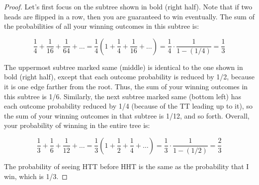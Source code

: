 \documentclass[14pt]{extarticle}
\begin{document}
\begin{proof}
Let’s first focus on the subtree shown in bold (right half). Note that if two heads are flipped in a row, then you are guaranteed to win eventually. The sum of the probabilities of all your winning outcomes in this subtree is:

$$
\frac{1}{4} + \frac{1}{16} + \frac{1}{64} + \ldots = \frac{1}{4}\left(1 + \frac{1}{4} + \frac{1}{16} + \ldots \right) = \frac{1}{4} \cdot \frac{1}{1-(1/4)} = \frac{1}{3}
$$

The uppermost subtree marked same (middle) is identical to the one shown in bold (right half), except that each outcome probability is reduced by 1/2, because it is one edge farther from the root. Thus, the sum of your winning outcomes in this subtree is 1/6. Similarly, the next subtree marked same (bottom left) has each outcome probability reduced by 1/4 (because of the TT leading up to it), so the sum of your winning outcomes in that subtree is 1/12, and so forth. Overall, your probability of winning in the entire tree is:

$$
\frac{1}{3} + \frac{1}{6} + \frac{1}{12} + \ldots = \frac{1}{3}\left(1 + \frac{1}{2} + \frac{1}{4} + \ldots \right) = \frac{1}{3} \cdot \frac{1}{1-(1/2)} = \frac{2}{3}
$$

The probability of seeing HTT before HHT is the same as the probability that I win, which is 1/3.
\end{proof}
\end{document}
